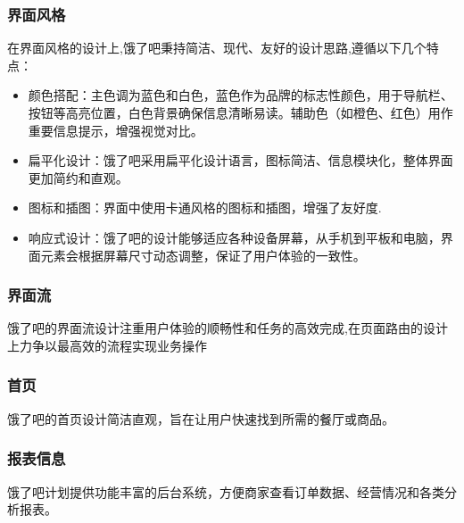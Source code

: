 \subsubsection{界面风格}
在界面风格的设计上,饿了吧秉持简洁、现代、友好的设计思路,遵循以下几个特点：
\begin{itemize}
    \item 颜色搭配：主色调为蓝色和白色，蓝色作为品牌的标志性颜色，用于导航栏、按钮等高亮位置，白色背景确保信息清晰易读。辅助色（如橙色、红色）用作重要信息提示，增强视觉对比。
    \item 扁平化设计：饿了吧采用扁平化设计语言，图标简洁、信息模块化，整体界面更加简约和直观。
    \item 图标和插图：界面中使用卡通风格的图标和插图，增强了友好度.
    \item 响应式设计：饿了吧的设计能够适应各种设备屏幕，从手机到平板和电脑，界面元素会根据屏幕尺寸动态调整，保证了用户体验的一致性。
\end{itemize}

\subsubsection{界面流}
饿了吧的界面流设计注重用户体验的顺畅性和任务的高效完成,在页面路由的设计上力争以最高效的流程实现业务操作
\subsubsection{首页}
饿了吧的首页设计简洁直观，旨在让用户快速找到所需的餐厅或商品。
\subsubsection{报表信息}
饿了吧计划提供功能丰富的后台系统，方便商家查看订单数据、经营情况和各类分析报表。